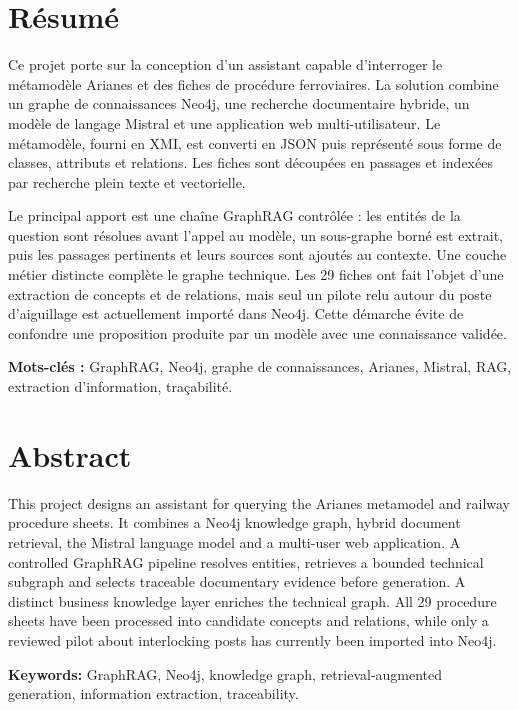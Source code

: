\chapter*{Résumé}

Ce projet porte sur la conception d'un assistant capable d'interroger le métamodèle Arianes et des fiches de procédure ferroviaires. La solution combine un graphe de connaissances Neo4j, une recherche documentaire hybride, un modèle de langage Mistral et une application web multi-utilisateur. Le métamodèle, fourni en XMI, est converti en JSON puis représenté sous forme de classes, attributs et relations. Les fiches sont découpées en passages et indexées par recherche plein texte et vectorielle.

Le principal apport est une chaîne GraphRAG contrôlée : les entités de la question sont résolues avant l'appel au modèle, un sous-graphe borné est extrait, puis les passages pertinents et leurs sources sont ajoutés au contexte. Une couche métier distincte complète le graphe technique. Les 29 fiches ont fait l'objet d'une extraction de concepts et de relations, mais seul un pilote relu autour du poste d'aiguillage est actuellement importé dans Neo4j. Cette démarche évite de confondre une proposition produite par un modèle avec une connaissance validée.

\textbf{Mots-clés :} GraphRAG, Neo4j, graphe de connaissances, Arianes, Mistral, RAG, extraction d'information, traçabilité.

\chapter*{Abstract}

This project designs an assistant for querying the Arianes metamodel and railway procedure sheets. It combines a Neo4j knowledge graph, hybrid document retrieval, the Mistral language model and a multi-user web application. A controlled GraphRAG pipeline resolves entities, retrieves a bounded technical subgraph and selects traceable documentary evidence before generation. A distinct business knowledge layer enriches the technical graph. All 29 procedure sheets have been processed into candidate concepts and relations, while only a reviewed pilot about interlocking posts has currently been imported into Neo4j.

\textbf{Keywords:} GraphRAG, Neo4j, knowledge graph, retrieval-augmented generation, information extraction, traceability.

